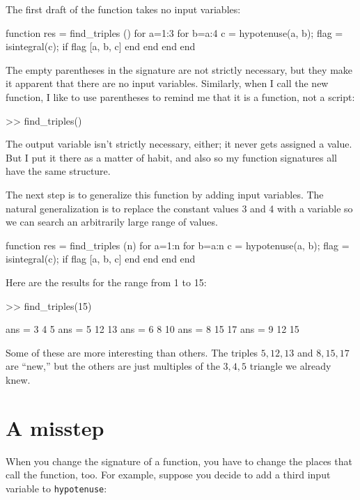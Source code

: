 \documentclass[
]{book}
\numberwithin{Answer}{chapter}
\numberwithin{Exercise}{chapter}
\begin{document}
The first draft of the function takes no input variables:

\begin{code}
function res = find_triples ()
    for a=1:3
        for b=a:4
            c = hypotenuse(a, b);
            flag = isintegral(c);
            if flag
                [a, b, c]
            end
        end
    end
end
\end{code}

The empty parentheses in the signature are not strictly necessary, but
they make it apparent that there are no input variables.  Similarly,
when I call the new function, I like to use parentheses to remind me
that it is a function, not a script:

\begin{code}
>> find_triples()
\end{code}

The output variable isn't strictly necessary, either; it
never gets assigned a value.  But I put it there as a matter of
habit, and also so my function signatures all have the same structure.

The next step is to generalize this function by adding input
variables.  The natural generalization is to replace the constant
values 3 and 4 with a variable so we can search an arbitrarily large
range of values.

\begin{code}
function res = find_triples (n)
    for a=1:n
        for b=a:n
            c = hypotenuse(a, b);
            flag = isintegral(c);
            if flag
                [a, b, c]
            end
        end
    end
end
\end{code}

Here are the results for the range from 1 to 15:

\begin{code}
>> find_triples(15)

ans = 3     4     5
ans = 5    12    13
ans = 6     8    10
ans = 8    15    17
ans = 9    12    15
\end{code}

Some of these are more interesting than others.  The triples
$5,12,13$ and $8,15,17$ are ``new,'' but the others are just
multiples of the $3,4,5$ triangle we already knew.


\section{A misstep}

When you change the signature of a function, you have to change
the places that call the function, too.  For example, suppose
you decide to add a third input variable to {\tt hypotenuse}:
\end{document}
